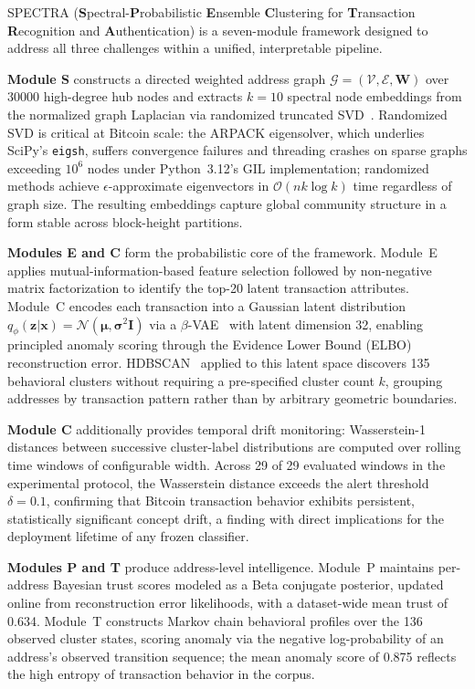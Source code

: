 \documentclass[journal]{IEEEtran}
\begin{document}
\textsc{SPECTRA}
(\textbf{S}pectral-\textbf{P}robabilistic \textbf{E}nsemble \textbf{C}lustering
for \textbf{T}ransaction \textbf{R}ecognition and \textbf{A}uthentication)
is a seven-module framework designed to address all three challenges within a
unified, interpretable pipeline.

\textbf{Module S} constructs a directed weighted address graph
$\mathcal{G} = (\mathcal{V}, \mathcal{E}, \mathbf{W})$ over \num{30000}
high-degree hub nodes and extracts $k=10$ spectral node embeddings from the
normalized graph Laplacian via randomized truncated SVD~\cite{Halko2011}.
Randomized SVD is critical at Bitcoin scale: the ARPACK eigensolver, which
underlies SciPy's \texttt{eigsh}, suffers convergence failures and threading
crashes on sparse graphs exceeding $10^6$ nodes under Python~3.12's GIL
implementation; randomized methods achieve $\epsilon$-approximate
eigenvectors in $\mathcal{O}(nk\log k)$ time regardless of graph size.
The resulting embeddings capture global community structure in a form stable
across block-height partitions.

\textbf{Modules E and C} form the probabilistic core of the framework.
Module~E applies mutual-information-based feature selection followed by
non-negative matrix factorization to identify the top-20 latent transaction
attributes.
Module~C encodes each transaction into a Gaussian latent distribution
$q_\phi(\mathbf{z}|\mathbf{x}) = \mathcal{N}(\boldsymbol{\mu}, \boldsymbol{\sigma}^2\mathbf{I})$
via a $\beta$-VAE~\cite{Kingma2014} with latent dimension \num{32},
enabling principled anomaly scoring through the Evidence Lower Bound (ELBO)
reconstruction error.
HDBSCAN~\cite{McInnes2017} applied to this latent space discovers \num{135}
behavioral clusters without requiring a pre-specified cluster count $k$,
grouping addresses by transaction pattern rather than by arbitrary
geometric boundaries.

\textbf{Module C} additionally provides temporal drift monitoring: Wasserstein-1
distances between successive cluster-label distributions are computed over
rolling time windows of configurable width.
Across \num{29} of \num{29} evaluated windows in the experimental protocol,
the Wasserstein distance exceeds the alert threshold $\delta = 0.1$,
confirming that Bitcoin transaction behavior exhibits persistent, statistically
significant concept drift, a finding with direct implications for the
deployment lifetime of any frozen classifier.

\textbf{Modules P and T} produce address-level intelligence.
Module~P maintains per-address Bayesian trust scores modeled as a Beta
conjugate posterior, updated online from reconstruction error likelihoods,
with a dataset-wide mean trust of \num{0.634}.
Module~T constructs Markov chain behavioral profiles over the \num{136}
observed cluster states, scoring anomaly via the negative log-probability
of an address's observed transition sequence; the mean anomaly score of
\num{0.875} reflects the high entropy of transaction behavior in the
corpus.
\end{document}

